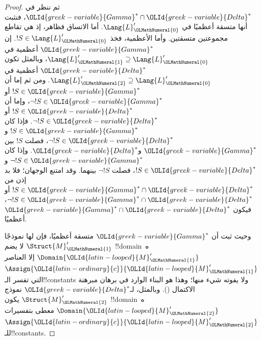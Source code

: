 \documentclass[../../../include/open-logic-section]{subfiles}
\begin{document}
\begin{proof}
ثم ننظر في ${\OLId{greek-variable}{Gamma}}^* \cap {\OLId{greek-variable}{Delta}}^*$، فنثبت أنها متسقة أعظميًا في
$\Lang{L}'_{\OLMathNumeral{0}}$. أما الاتساق فظاهر، إذ هي تقاطع مجموعتين متسقتين. وأما
الأعظمية، فخذ $!S \in \Lang{L}'_{\OLMathNumeral{0}}$. إن ${\OLId{greek-variable}{Gamma}}^*$ أعظمية في
$\Lang{L}'_{\OLMathNumeral{1}} \supseteq \Lang{L}'_{\OLMathNumeral{0}}$، وبالمثل تكون ${\OLId{greek-variable}{Delta}}^*$ أعظمية
في $\Lang{L}'_{\OLMathNumeral{2}} \supseteq \Lang{L}'_{\OLMathNumeral{0}}$. ومن ثم إما أن
$!S \in {\OLId{greek-variable}{Gamma}}^*$ أو $\lnot !S \in {\OLId{greek-variable}{Gamma}}^*$، وإما أن
$!S \in {\OLId{greek-variable}{Delta}}^*$ أو $\lnot !S \in {\OLId{greek-variable}{Delta}}^*$. فإذا كان
$!S \in {\OLId{greek-variable}{Gamma}}^*$ و$\lnot !S \in {\OLId{greek-variable}{Delta}}^*$، فصلت $!S$ بين
${\OLId{greek-variable}{Gamma}}^*$ و${\OLId{greek-variable}{Delta}}^*$. وإذا كان $\lnot !S \in {\OLId{greek-variable}{Gamma}}^*$ و
$!S \in {\OLId{greek-variable}{Delta}}^*$، فصلت $\lnot !S$ بينهما. وقد امتنع الوجهان؛ فلا بد إذن من
$!S \in {\OLId{greek-variable}{Gamma}}^* \cap {\OLId{greek-variable}{Delta}}^*$ أو
$\lnot !S \in {\OLId{greek-variable}{Gamma}}^* \cap {\OLId{greek-variable}{Delta}}^*$، فيكون
${\OLId{greek-variable}{Gamma}}^* \cap {\OLId{greek-variable}{Delta}}^*$ أعظميًا.

وحيث ثبت أن ${\OLId{greek-variable}{Gamma}}^*$ متسقة أعظميًا، فإن لها نموذجًا $\Struct{M}'_{\OLMathNumeral{1}}$ لا يضم
!!{domain}ه~$\Domain{{\OLId{latin-looped}{M}}'_{\OLMathNumeral{1}}}$ إلا العناصر $\Assign{{\OLId{latin-ordinary}{c}}}{{\OLId{latin-looped}{M}}'_{\OLMathNumeral{1}}}$ التي تفسر
الـ!!{constant}s ولا يفوته شيء منها؛ وهذا هو البناء الوارد في برهان مبرهنة الاكتمال
(). وبالمثل، لـ${\OLId{greek-variable}{Delta}}^*$ نموذج
$\Struct{M}'_{\OLMathNumeral{2}}$ يكون !!{domain}ه~$\Domain{{\OLId{latin-looped}{M}}'_{\OLMathNumeral{2}}}$ معطى بتفسيرات
$\Assign{{\OLId{latin-ordinary}{c}}}{{\OLId{latin-looped}{M}}'_{\OLMathNumeral{2}}}$ للـ!!{constant}s.


\end{proof}
\end{document}
